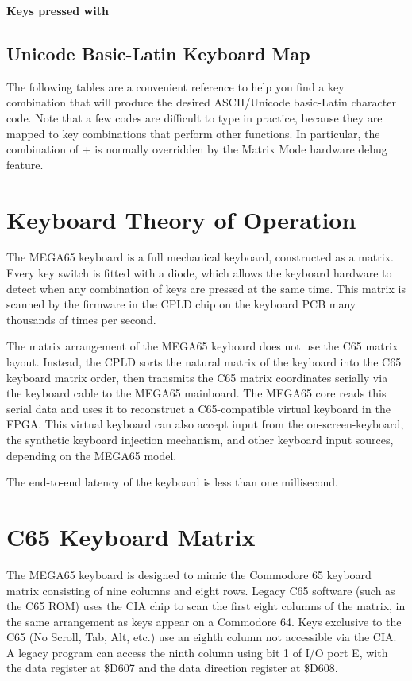 \begin{minipage}{\textwidth}
\bf{Keys pressed with }

\end{minipage}

\subsection{Unicode Basic-Latin Keyboard Map}

The following tables are a convenient reference to help you find a key combination that will produce the desired ASCII/Unicode basic-Latin character code.  Note that a few codes are difficult to type in practice, because they are mapped to key combinations that perform other functions. In particular, the combination of \megasymbol +  is normally overridden by the Matrix Mode hardware debug feature.




\newpage
\section{Keyboard Theory of Operation}

The MEGA65 keyboard is a full mechanical keyboard, constructed as a matrix. Every key switch is fitted with a diode, which allows the keyboard hardware to detect when any combination of keys are pressed at the same time. This matrix is scanned by the firmware in the CPLD chip on the keyboard PCB many thousands of times per second.

The matrix arrangement of the MEGA65 keyboard does not use the C65 matrix layout. Instead, the CPLD sorts the natural matrix of the keyboard into the C65 keyboard matrix order, then transmits the C65 matrix coordinates serially via the keyboard cable to the MEGA65 mainboard. The MEGA65 core reads this serial data and uses it to reconstruct a C65-compatible virtual keyboard in the FPGA. This virtual keyboard can also accept input from the
on-screen-keyboard, the synthetic keyboard injection mechanism, and other keyboard input sources, depending on the MEGA65 model.

The end-to-end latency of the keyboard is less than one millisecond.

\section{C65 Keyboard Matrix}

The MEGA65 keyboard is designed to mimic the Commodore 65 keyboard matrix consisting of nine columns and eight rows. Legacy C65 software (such as the C65 ROM) uses the CIA chip to scan the first eight columns of the matrix, in the same arrangement as keys appear on a Commodore 64. Keys exclusive to the C65 (No Scroll, Tab, Alt, etc.) use an eighth column not accessible via the CIA. A legacy program can access the ninth column using bit 1 of I/O port E, with the data register at \$D607 and the data direction register at \$D608.

